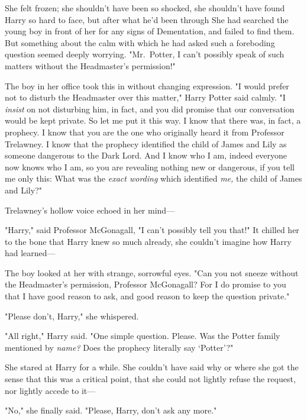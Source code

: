 She felt frozen; she shouldn't have been so shocked, she shouldn't have found
Harry so hard to face, but after what he'd been through{\el} She had
searched the young boy in front of her for any signs of Dementation, and failed
to find them. But something about the calm with which he had asked such a
foreboding question seemed deeply worrying. "Mr.~Potter, I can't possibly speak
of such matters without the Headmaster's permission!"

The boy in her office took this in without changing expression. "I would prefer
not to disturb the Headmaster over this matter," Harry Potter said calmly. "I
\emph{insist} on not disturbing him, in fact, and you did promise that our
conversation would be kept private. So let me put it this way. I know that
there was, in fact, a prophecy. I know that you are the one who originally
heard it from Professor Trelawney. I know that the prophecy identified the
child of James and Lily as someone dangerous to the Dark Lord. And I know who I
am, indeed everyone now knows who I am, so you are revealing nothing new or
dangerous, if you tell me only this: What was the \emph{exact wording} which
identified \emph{me,} the child of James and Lily?"

Trelawney's hollow voice echoed in her mind---


"Harry," said Professor McGonagall, "I can't possibly tell you that!" It
chilled her to the bone that Harry knew so much already, she couldn't imagine
how Harry had learned---

The boy looked at her with strange, sorrowful eyes. "Can you not sneeze without
the Headmaster's permission, Professor McGonagall? For I do promise to you that
I have good reason to ask, and good reason to keep the question private."

"Please don't, Harry," she whispered.

"All right," Harry said. "One simple question. Please. Was the Potter family
mentioned by \emph{name?} Does the prophecy literally say `Potter'?"

She stared at Harry for a while. She couldn't have said why or where she got
the sense that this was a critical point, that she could not lightly refuse the
request, nor lightly accede to it---

"No," she finally said. "Please, Harry, don't ask any more."

